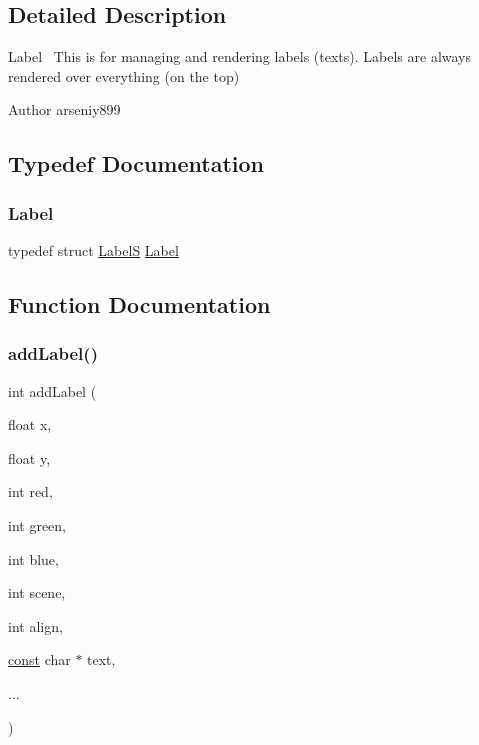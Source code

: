 \subsection{Detailed Description}
Label~\newline
This is for managing and rendering labels (texts). Labels are always rendered over everything (on the top) 

\begin{DoxyAuthor}{Author}
arseniy899 
\end{DoxyAuthor}


\subsection{Typedef Documentation}
\mbox{\label{group___label_gab5319af999278b49f29385da80cb46e7}} 
\subsubsection{\texorpdfstring{Label}{Label}}
{\footnotesize\ttfamily typedef struct \hyperlink{struct_label_s}{LabelS} \hyperlink{group___label_gab5319af999278b49f29385da80cb46e7}{Label}}



\subsection{Function Documentation}
\mbox{\label{group___label_ga0530c926875e32c0f86862477dd71556}} 
\subsubsection{\texorpdfstring{add\+Label()}{addLabel()}}
{\footnotesize\ttfamily int add\+Label (\begin{DoxyParamCaption}\item[{float}]{x,  }\item[{float}]{y,  }\item[{int}]{red,  }\item[{int}]{green,  }\item[{int}]{blue,  }\item[{int}]{scene,  }\item[{int}]{align,  }\item[{\hyperlink{zconf_8h_a2c212835823e3c54a8ab6d95c652660e}{const} char $\ast$}]{text,  }\item[{}]{... }\end{DoxyParamCaption})}

